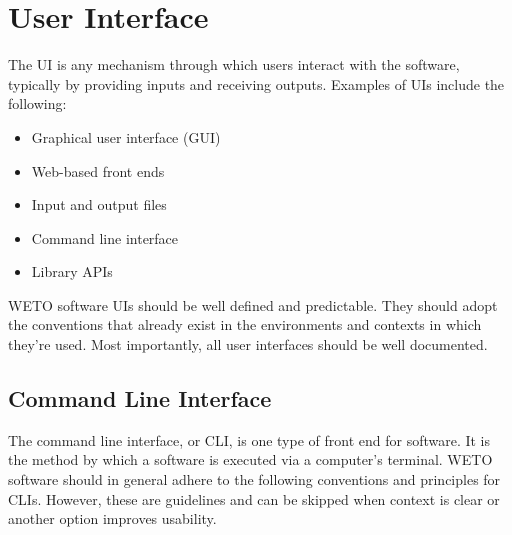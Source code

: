 \documentclass[]{nlr}
\begin{document}
\section{User Interface}
The UI is any mechanism through which users interact with the software,
typically by providing inputs and receiving outputs. Examples of UIs include the following:

\begin{itemize}
\item Graphical user interface (GUI)
\item Web-based front ends
\item Input and output files
\item Command line interface
\item Library APIs
\end{itemize}

WETO software UIs should be well defined and predictable.
They should adopt the conventions that already exist in the environments and contexts
in which they're used.
Most importantly, all user interfaces should be well documented.

\subsection{Command Line Interface}
The command line interface, or CLI, is one type of front end for software.
It is the method by which a software is executed via a computer’s terminal.
WETO software should in general adhere to the following conventions and principles for CLIs.
However, these are guidelines and can be skipped when context is clear or another
option improves usability.
\end{document}
